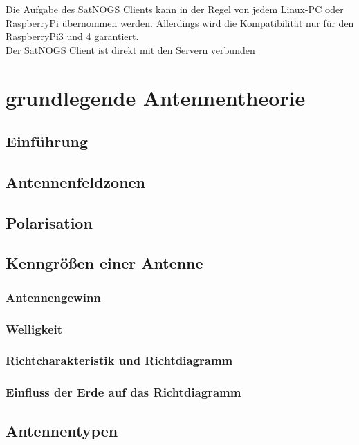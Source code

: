\documentclass[12pt]{scrreprt}
\begin{document}
	
	Die Aufgabe des SatNOGS Clients kann in der Regel von jedem Linux-PC oder RaspberryPi übernommen werden. Allerdings wird die Kompatibilität nur für den RaspberryPi3 und 4 garantiert.\\
	
	
	Der SatNOGS Client ist direkt mit den Servern verbunden
	\pagebreak
	
	\section{grundlegende Antennentheorie}
	\subsection{Einführung}
	
	\subsection{Antennenfeldzonen}
	
	\subsection{Polarisation}
	
	\subsection{Kenngrößen einer Antenne}
	
	\subsubsection{Antennengewinn}
	
	\subsubsection{Welligkeit}
	
	\subsubsection{Richtcharakteristik und Richtdiagramm}
	
	\subsubsection{Einfluss der Erde auf das Richtdiagramm}
	
	\subsection{Antennentypen}
	
\end{document}
